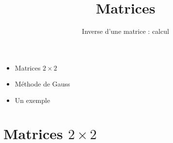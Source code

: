 






\title{{\bf Matrices}}
\subtitle{Inverse d'une matrice : calcul}

\begin{frame}
  
  \debutmontitre

  \pause

{\footnotesize
\hfill
{}
\begin{minipage}{0.6\textwidth}
  \begin{itemize}
    \item<3-> Matrices $2 \times 2$
    \item<4-> Méthode de Gauss
    \item<5-> Un exemple
  \end{itemize}
\end{minipage}
}

\end{frame}

\setcounter{framenumber}{0}


\section{Matrices $2 \times 2$}

